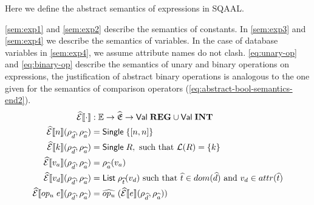 Here we define the abstract semantics of expressions in SQAAL.

\autoref{sem:exp1} and \ref{sem:exp2} describe the semantics of constants.
In \autoref{sem:exp3} and \ref{sem:exp4} we describe the semantics of variables.
In the case of database variables in \autoref{sem:exp4}, we assume attribute names do not clash.
\autoref{eq:unary-op} and \ref{eq:binary-op} describe the semantics of unary and binary operations on expressions, the justification of abstract binary operations is analogous to the one given for the semantics of comparison operators (\autoref{eq:abstract-bool-semantics-end2}).
\begin{align}
    \absexpsem{\cdot} &: \mathbb{E} \rightarrow \ab{\mathfrak{E}} \rightarrow \mathsf{Val} \; \mathbf{REG} \cup \mathsf{Val} \; \mathbf{INT}\\
    \absexpsem{n}(\rho_{\ab{d}}, \rho_{\ab{a}}) &= \mathsf{Single} \; \{ [n, n] \} \label{sem:exp1} \\
    \absexpsem{k}(\rho_{\ab{d}}, \rho_{\ab{a}}) &= \mathsf{Single} \; R,  \text{ such that }\mathcal{L}(R) = \{ k \} \label{sem:exp2} \\
    \absexpsem{v_a}(\rho_{\ab{d}}, \rho_{\ab{a}}) &=  \rho_{\ab{a}}(v_a) \label{sem:exp3} \\
    \absexpsem{v_d}(\rho_{\ab{d}}, \rho_{\ab{a}}) &=  \mathsf{List} \; \rho_{\ab{t}}(v_d) \text{ such that } \ab{t} \in dom(\ab{d}) \text{ and } v_d \in attr(\ab{t}) \label{sem:exp4} \\
    \absexpsem{op_u \; e}(\rho_{\ab{d}}, \rho_{\ab{a}}) &= \ab{op_u} \; (\absexpsem{e}(\rho_{\ab{d}}, \rho_{\ab{a}})) \label{eq:unary-op} \\
\end{align}

